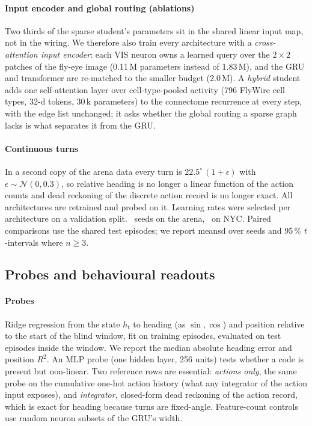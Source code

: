 \paragraph{Input encoder and global routing (ablations)}
Two thirds of the sparse student's parameters sit in the shared linear input map, not in the wiring. We therefore also
train every architecture with a \emph{cross-attention input encoder}: each VIS neuron owns a learned query over the
$2\times2$ patches of the fly-eye image (0.11\,M parameters instead of 1.83\,M), and the GRU and transformer are
re-matched to the smaller budget (2.0\,M). A \emph{hybrid} student adds one self-attention layer over cell-type-pooled
activity (796 FlyWire cell types, 32-d tokens, 30\,k parameters) to the connectome recurrence at every step, with the
edge list unchanged; it asks whether the global routing a sparse graph lacks is what separates it from the GRU.

\paragraph{Continuous turns} In a second copy of the arena data every turn is $22.5^\circ\,(1+\epsilon)$ with
$\epsilon \sim \mathcal{N}(0, 0.3)$, so relative heading is no longer a linear function of the action counts and
dead reckoning of the discrete action record is no longer exact. All architectures are retrained and probed on it.
Learning rates were selected per architecture on a validation split. \nSeeds\ seeds on the arena, \nSeedsNyc\ on NYC. Paired
comparisons use the shared test episodes; we report mean\pm sd over seeds and 95\,\% $t$-intervals where $n \ge 3$.

\subsection{Probes and behavioural readouts}
\label{sec:probe-method}
\paragraph{Probes} Ridge regression from the state $h_t$ to heading (as $\sin,\cos$) and position relative to the
start of the blind window, fit on training episodes, evaluated on test episodes inside the window. We report the median
absolute heading error and position $R^2$. An MLP probe (one hidden layer, 256 units) tests whether a code is present
but non-linear. Two reference rows are essential: \emph{actions only}, the same probe on the cumulative one-hot action
history (what any integrator of the action input exposes), and \emph{integrator}, closed-form dead reckoning of the
action record, which is exact for heading because turns are fixed-angle. Feature-count controls use random neuron
subsets of the GRU's width.

